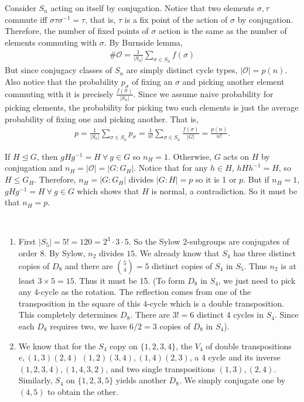 \documentclass[12pt]{article}
\begin{document}
\begin{problem}[3]
Consider $ S_n$ acting on itself by conjugation. Notice that two elements $ \sigma, \tau$ commute iff $ \sigma \tau \sigma^{-1} = \tau$, that is, $ \tau$ is a fix point of the action of $ \sigma$ by conjugation. Therefore, the number of fixed points of $ \sigma$ action is the same as the number of elements commuting with $ \sigma$. By Burnside lemma,
\begin{align*}
	\# \mathcal{ O} = \frac{1}{|S_n|} \sum_{ \sigma \in S_n} f( \sigma)
\end{align*}
But since conjugacy classes of $ S_n$ are simply distinct cycle types, $ | \mathcal{ O}| = p(n)$. Also notice that the probability $ p_ \sigma$ of fixing an  $ \sigma$ and picking another element commuting with it is precisely $ \frac{ f(\sigma)}{|S_n|}$. Since we assume naive probability for picking elements, the probability for picking two such elements is just the average probability of fixing one and picking another. That is, 
\begin{align*}
p = \frac{1}{|S_n|} \sum_{ \sigma \in S_n} p_ \sigma = \frac{1}{n!} \sum_{ \sigma \in S_n} \frac{f( \sigma)}{|G| } = \frac{p(n)}{ n!}.
\end{align*}
\end{problem}

\begin{problem}[4]
If $ H \trianglelefteq G$, then $ gHg^{-1} = H \ \forall \ g \in G$ so $ n_H =1$. Otherwise,  $ G$ acts on  $ H$ by conjugation and $n_H = | \mathcal{ O}| = |G: G_H|$. Notice that for any $ h \in H$, $ hHh^{-1} = H$, so $ H \leq G_H$. Therefore,  $n_H= |G:G_H|$ divides  $ |G:H| = p$ so it is 1 or  $ p$. But if $ n_H = 1$,  $ gHg^{-1} = H \ \forall \ g \in G$ which shows that $ H$ is normal, a contradiction. So it must be that  $ n_H = p$.
\end{problem}
\begin{problem}[5]
~\begin{enumerate}[label=(\alph*)]
	\item First $ |S_5| =5!= 120 = 2^3 \cdot 3 \cdot 5$. So the Sylow 2-subgroups are conjugates of order 8. By Sylow, $ n_2 $ divides $ 15$. We already know that $ S_4$ has three distinct copies of $ D_8$ and there are $ \binom{5}{4} =5$ distinct copies of $ S_4$ in $S_5$. Thus $n_2$ is at least $ 3\times 5 = 15$. Thus it must be 15. (To form $ D_8$ in $ S_4$, we just need to pick any 4-cycle as the rotation. The reflection comes from one of the transposition in the square of this 4-cycle which is a double transposition. This completely determines $ D_8$. There are $ 3!=6$ distinct 4 cycles in  $ S_4$. Since each $ D_8$ requires two, we have $ 6 /2 = 3$ copies of  $ D_8$ in $ S_4$).
	\item We know that for the $ S_4$ copy on $ \{1,2,3,4\} $, the $ V_4$ of double transpositions $e, (1,3)(2,4)$ $(1,2)(3,4), (1,4)(2,3)$, a 4 cycle and its inverse $ (1,2,3,4),(1,4,3,2)$, and two single transpositions $ (1,3),(2,4)$. Similarly, $ S_4$ on $ \{1,2,3,5\}$ yields another $ D_8$. We simply conjugate one by $ (4,5)$ to obtain the other.
\end{enumerate}
\end{problem}
\end{document}
